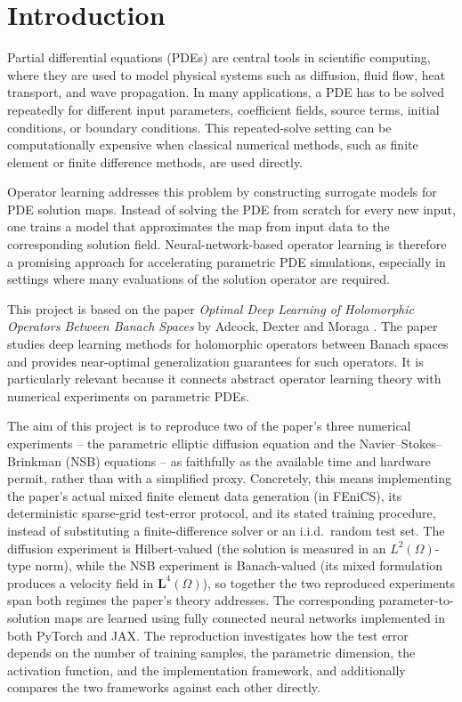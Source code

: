 \cleardoubleoddpage%
\chapter{Introduction}
\label{sec:introduction}

Partial differential equations (PDEs) are central tools in scientific computing, where they are used to model physical systems such as diffusion, fluid flow, heat transport, and wave propagation. In many applications, a PDE has to be solved repeatedly for different input parameters, coefficient fields, source terms, initial conditions, or boundary conditions. This repeated-solve setting can be computationally expensive when classical numerical methods, such as finite element or finite difference methods, are used directly.

Operator learning addresses this problem by constructing surrogate models for PDE solution maps. Instead of solving the PDE from scratch for every new input, one trains a model that approximates the map from input data to the corresponding solution field. Neural-network-based operator learning is therefore a promising approach for accelerating parametric PDE simulations, especially in settings where many evaluations of the solution operator are required.

This project is based on the paper \emph{Optimal Deep Learning of Holomorphic Operators Between Banach Spaces} by Adcock, Dexter and Moraga
\cite{adcock2024holomorphic}. The paper studies deep learning methods for
holomorphic operators between Banach spaces and provides near-optimal
generalization guarantees for such operators. It is particularly relevant because it connects abstract operator learning theory with numerical experiments on parametric PDEs.

The aim of this project is to reproduce two of the paper's three numerical
experiments -- the parametric elliptic diffusion equation and the
Navier--Stokes--Brinkman (NSB) equations -- as faithfully as the available
time and hardware permit, rather than with a simplified proxy. Concretely,
this means implementing the paper's actual mixed finite element data
generation (in FEniCS), its deterministic sparse-grid test-error protocol,
and its stated training procedure, instead of substituting a
finite-difference solver or an i.i.d.\ random test set. The diffusion
experiment is Hilbert-valued (the solution is measured in an
$L^2(\Omega)$-type norm), while the NSB experiment is Banach-valued (its
mixed formulation produces a velocity field in $\mathbf{L}^4(\Omega)$),
so together the two reproduced experiments span both regimes the paper's
theory addresses. The corresponding parameter-to-solution maps are
learned using fully connected neural networks implemented in both PyTorch
and JAX. The reproduction investigates how the test error depends on the
number of training samples, the parametric dimension, the activation
function, and the implementation framework, and additionally compares the
two frameworks against each other directly.

